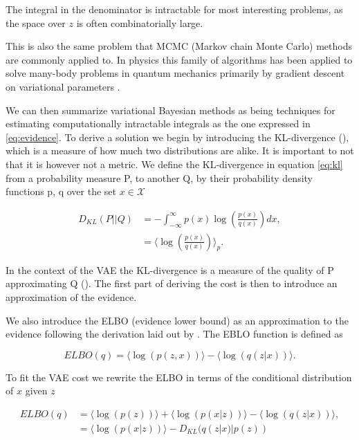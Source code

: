 \noindent The integral in the denominator is intractable for most interesting problems, as the space over $z$ is often combinatorially large. 

This is also the same problem that MCMC (Markov chain Monte Carlo) methods are commonly applied to. In physics this family of algorithms has been applied to solve many-body problems in quantum mechanics primarily by gradient descent on variational parameters .

We can then summarize variational Bayesian methods as being techniques for estimating computationally intractable integrals as the one expressed in \ref{eq:evidence}. To derive a solution we begin by introducing the KL-divergence (\cite{Kullback1951}), which is a measure of how much two distributions are alike. It is important to not that it is however not a metric. We define the KL-divergence in equation \ref{eq:kl} from a probability measure P, to another Q, by their probability density functions p, q over the set $x \in \mathcal{X}$

\begin{align}\label{eq:kl}
D_{KL} (P || Q) &= - \int^{\infty}_{-\infty} p(x) \log \left(\frac{p(x)}{q(x)}\right) dx, \\
&= \langle \log \left(\frac{p(x)}{q(x)} \right)\rangle_{p}.
\end{align}

\noindent In the context of the VAE the KL-divergence is a measure of the quality of P approximating Q (\cite{Burnham2002}). The first part of deriving the cost is then to introduce an approximation of the evidence. 

We also introduce the ELBO (evidence lower bound) as an approximation to the evidence following the derivation laid out by \cite{Kingma2013}. The EBLO function is defined as 

\begin{equation}\label{eq:elbo}
ELBO(q) = \langle \log(p(z, x)) \rangle - \langle \log(q(z|x)) \rangle.
\end{equation}

\noindent To fit the VAE cost we rewrite the ELBO in terms of the conditional distribution of $x$ given $z$

\begin{align}
ELBO(q) &= \langle \log(p(z)) \rangle +  \langle \log(p(x|z)) \rangle - \langle \log(q(z|x)) \rangle, \\
&=   \langle \log(p(x|z)) \rangle - D_{KL}(q(z|x) | p(z))
\end{align}

